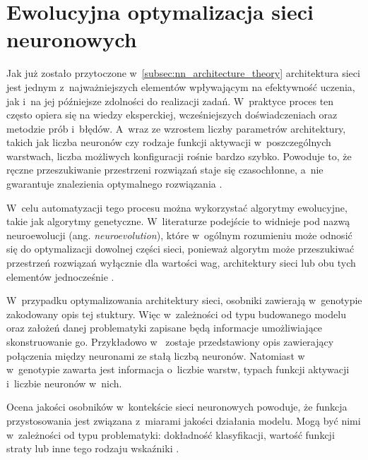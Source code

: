 \section{Ewolucyjna optymalizacja sieci neuronowych}
Jak już zostało przytoczone
w~\cref{subsec:nn_architecture_theory}
architektura sieci jest jednym z~najważniejszych
elementów wpływającym na efektywność uczenia,
jak i~na jej późniejsze zdolności do realizacji zadań.
W~praktyce proces ten często opiera się
na wiedzy eksperckiej,
wcześniejszych doświadczeniach
oraz metodzie prób i~błędów.
A~wraz ze wzrostem liczby parametrów architektury,
takich jak liczba neuronów
czy rodzaje funkcji aktywacji
w~poszczególnych warstwach,
liczba możliwych konfiguracji rośnie bardzo szybko.
Powoduje to, że ręczne przeszukiwanie przestrzeni
rozwiązań staje się czasochłonne, a~nie gwarantuje
znalezienia optymalnego rozwiązania%
.

W~celu automatyzacji tego procesu
można wykorzystać algorytmy ewolucyjne,
takie jak algorytmy genetyczne.
W~literaturze podejście to
widnieje pod nazwą neuroewolucji
(ang. \textit{neuroevolution}),
które w~ogólnym rozumieniu może odnosić się
do optymalizacji dowolnej części sieci,
ponieważ algorytm może
przeszukiwać przestrzeń rozwiązań
wyłącznie dla wartości wag,
architektury sieci
lub obu tych elementów jednocześnie%
.

W~przypadku optymalizowania architektury sieci,
osobniki zawierają w~genotypie
zakodowany opis tej stuktury.
Więc w~zależności od typu budowanego modelu
oraz założeń danej problematyki zapisane
będą informacje umożliwiające skonstruowanie go.
Przykładowo w~
zostaje przedstawiony opis zawierający
połączenia między neuronami
ze stałą liczbą neuronów.
Natomiast w~
w~genotypie zawarta jest informacja
o~liczbie warstw, typach funkcji aktywacji
i~liczbie neuronów w~nich.

Ocena jakości osobników w~kontekście
sieci neuronowych powoduje,
że funkcja przystosowania jest związana
z~miarami jakości działania modelu.
Mogą być nimi w~zależności od typu problematyki:
dokładność klasyfikacji, wartość funkcji straty
lub inne tego rodzaju wskaźniki%
.

